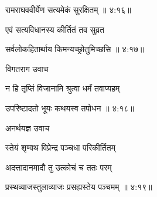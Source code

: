 {\devanagarifont रामराघववीर्येण सत्यमेकं सुरक्षितम् {॥ ४:१६॥} \veg\dontdisplaylinenum }%

{\devanagarifont एवं सत्यविधानस्य कीर्तितं तव सुव्रत \thinspace{\dandab} \dontdisplaylinenum }%


{\devanagarifont सर्वलोकहितार्थाय किमन्यच्छ्रोतुमिच्छसि {॥ ४:१७॥} \veg\dontdisplaylinenum }%
 

{\devanagarifont विगतराग उवाच {\dandab}\dontdisplaylinenum  }%
 
{\devanagarifont न हि तृप्तिं विजानामि श्रुत्वा धर्मं तवाप्यहम् \thinspace{\danda} \dontdisplaylinenum }%


{\devanagarifont उपरिष्टादतो भूयः कथयस्व तपोधन {॥ ४:१८॥} \veg\dontdisplaylinenum }%

{\devanagarifont अनर्थयज्ञ उवाच {\dandab}\dontdisplaylinenum  }%
 
{\devanagarifont स्तेयं शृण्वथ विप्रेन्द्र पञ्चधा परिकीर्तितम् \thinspace{\danda} \dontdisplaylinenum }%

{\devanagarifont अदत्तादानमादौ तु उत्कोचं च ततः परम्  \danda\dontdisplaylinenum }%


{\devanagarifont प्रस्थव्याजस्तुलाव्याजः प्रसह्यस्तेय पञ्चमम् {॥ ४:१९॥} \veg\dontdisplaylinenum }%

